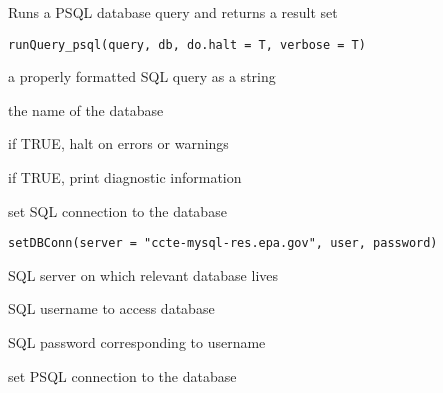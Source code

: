 \documentclass[letterpaper]{book}
\begin{document}
%
\begin{Description}\relax
Runs a PSQL database query and returns a result set
\end{Description}
%
\begin{Usage}
\begin{verbatim}
runQuery_psql(query, db, do.halt = T, verbose = T)
\end{verbatim}
\end{Usage}
%
\begin{Arguments}
\begin{ldescription}
\item[\code{query}] a properly formatted SQL query as a string

\item[\code{db}] the name of the database

\item[\code{do.halt}] if TRUE, halt on errors or warnings

\item[\code{verbose}] if TRUE, print diagnostic information
\end{ldescription}
\end{Arguments}
%
\begin{Description}\relax
set SQL connection to the database
\end{Description}
%
\begin{Usage}
\begin{verbatim}
setDBConn(server = "ccte-mysql-res.epa.gov", user, password)
\end{verbatim}
\end{Usage}
%
\begin{Arguments}
\begin{ldescription}
\item[\code{server}] SQL server on which relevant database lives

\item[\code{user}] SQL username to access database

\item[\code{password}] SQL password corresponding to username
\end{ldescription}
\end{Arguments}
%
\begin{Description}\relax
set PSQL connection to the database
\end{Description}
\end{document}
